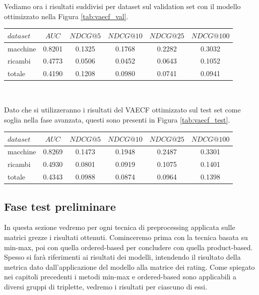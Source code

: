 Vediamo ora i risultati suddivisi per dataset sul validation set con il modello ottimizzato nella Figura \ref{tab:vaecf_val}.
\begin{center}
\begin{tabular}{|l|c|cccc|}
    \toprule
    $dataset$ &    $AUC$ &  $NDCG@5$ & $NDCG@10$  & $NDCG@25$ & $NDCG@100$  \\
    \midrule
    macchine & 0.8201 & 0.1325 & 0.1768 & 0.2282 & 0.3032 \\
    ricambi  & 0.4773 & 0.0506 & 0.0452 & 0.0643 & 0.1052 \\
    totale   & 0.4190 & 0.1208 & 0.0980 & 0.0741 & 0.0941 \\
\bottomrule
\end{tabular}\\
\label{tab:vaecf_val}
\end{center}
Dato che si utilizzeranno i risultati del VAECF ottimizzato sul test set come soglia nella fase avanzata, questi sono presenti in Figura \ref{tab:vaecf_test}.
\begin{center}
\begin{tabular}{|l|c|cccc|}
    \toprule
    $dataset$ &    $AUC$ &  $NDCG@5$ & $NDCG@10$  & $NDCG@25$ & $NDCG@100$  \\
    \midrule
    macchine & 0.8269 & 0.1473 &  0.1948 & 0.2487 & 0.3301 \\
    ricambi  & 0.4930 & 0.0801 &  0.0919 & 0.1075 & 0.1401 \\
    totale   & 0.4343 & 0.0988 &  0.0874 & 0.0964 & 0.1398 \\
\bottomrule
\end{tabular}
\label{tab:vaecf_test}
\end{center}

\subsection{Fase test preliminare}
In questa sezione vedremo per ogni tecnica di preprocessing applicata sulle matrici grezze i risultati ottenuti.
Cominceremo prima con la tecnica basata su min-max, poi con quella ordered-based per concludere con quella product-based. 
Spesso si farà riferimenti ai risultati dei modelli, intendendo il risultato della metrica dato dall'applicazione del modello alla matrice dei rating.
Come spiegato nei capitoli precedenti i metodi min-max e ordered-based sono applicabili a diversi gruppi di triplette, vedremo i risultati per ciascuno di essi.\\

